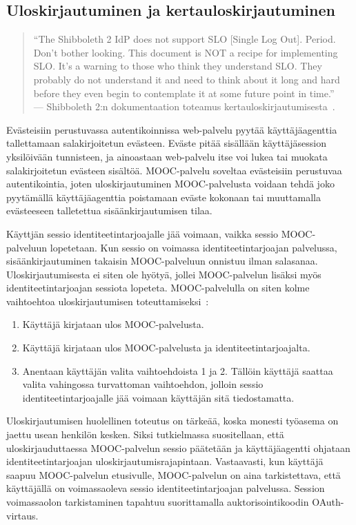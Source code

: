 \documentclass[finnish,gradu]{tktltiki}
\begin{document}
  \subsection{Uloskirjautuminen ja kertauloskirjautuminen} %
  \label{sub:kertauloskirjautuminen}
    \begin{quote}
      ``The Shibboleth 2 IdP does not support SLO [Single Log Out]. Period. Don't bother looking. This document is NOT a recipe for implementing SLO. It's a warning to those who think they understand SLO. They probably do not understand it and need to think about it long and hard before they even begin to contemplate it at some future point in time.''
    \\--- Shibboleth 2:n dokumentaation toteamus kertauloskirjautumisesta~\cite{shibboleth_wiki_slo}.
    \end{quote}

  Evästeisiin perustuvassa autentikoinnissa web-palvelu pyytää käyttäjäagenttia tallettamaan salakirjoitetun evästeen. Eväste pitää sisällään käyttäjäsession yksilöivään tunnisteen, ja ainoastaan web-palvelu itse voi lukea tai muokata salakirjoitetun evästeen sisältöä. MOOC-palvelu soveltaa evästeisiin perustuvaa autentikointia, joten uloskirjautuminen MOOC-palvelusta voidaan tehdä joko pyytämällä käyttäjäagenttia poistamaan eväste kokonaan tai muuttamalla evästeeseen talletettua sisäänkirjautumisen tilaa.

  Käyttjän sessio identiteetintarjoajalle jää voimaan, vaikka sessio MOOC-palveluun lopetetaan. Kun sessio on voimassa identiteetintarjoajan palvelussa, sisäänkirjautuminen takaisin MOOC-palveluun onnistuu ilman salasanaa. Uloskirjautumisesta ei siten ole hyötyä, jollei MOOC-palvelun lisäksi myös identiteetintarjoajan sessiota lopeteta. MOOC-palvelulla on siten kolme vaihtoehtoa uloskirjautumisen toteuttamiseksi~\cite{shepard_logout_2009}:

  \begin{enumerate}
    \item Käyttäjä kirjataan ulos MOOC-palvelusta.
    \item Käyttäjä kirjataan ulos MOOC-palvelusta ja identiteetintarjoajalta.
    \item Anentaan käyttäjän valita vaihtoehdoista 1 ja 2. Tällöin käyttäjä saattaa valita vahingossa turvattoman vaihtoehdon, jolloin sessio identiteetintarjoajalle jää voimaan käyttäjän sitä tiedostamatta.
  \end{enumerate}

  Uloskirjautumisen huolellinen toteutus on tärkeää, koska monesti työasema on jaettu usean henkilön kesken. Siksi tutkielmassa suositellaan, että uloskirjauduttaessa MOOC-palvelun sessio päätetään ja käyttäjäagentti ohjataan identiteetintarjoajan uloskirjautumisrajapintaan. Vastaavasti, kun käyttäjä saapuu MOOC-palvelun etusivulle, MOOC-palvelun on aina tarkistettava, että käyttäjällä on voimassaoleva sessio identiteetintarjoajan palvelussa. Session voimassaolon tarkistaminen tapahtuu suorittamalla auktorisointikoodin OAuth-virtaus.
\end{document}
